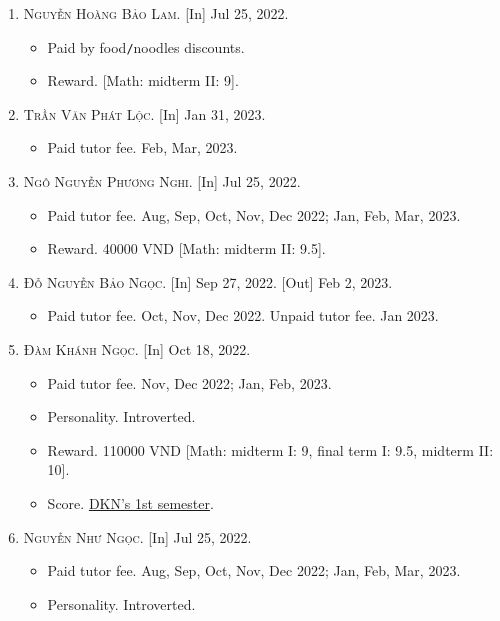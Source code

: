 \documentclass{article}
\begin{document}
\begin{enumerate}
\begin{itemize}
	\end{itemize}
	\item \textsc{Nguyễn Hoàng Bảo Lam.} \textsf{[In]} Jul 25, 2022.
	\begin{itemize}
		\item \textsf{Paid by food\texttt{/}noodles discounts.}
		\item \textsf{Reward.} [Math: midterm II: 9].
	\end{itemize}
	\item \textsc{Trần Văn Phát Lộc.} \textsf{[In]} Jan 31, 2023.
	\begin{itemize}
		\item \textsf{Paid tutor fee.} Feb, Mar, 2023.
	\end{itemize}
	\item \textsc{Ngô Nguyễn Phương Nghi.} \textsf{[In]} Jul 25, 2022.
	\begin{itemize}
		\item \textsf{Paid tutor fee.} Aug, Sep, Oct, Nov, Dec 2022; Jan, Feb, Mar, 2023.
		\item \textsf{Reward.} 40000 VND [Math: midterm II: 9.5].
	\end{itemize}
	\item \textsc{Đỗ Nguyễn Bảo Ngọc.} \textsf{[In]} Sep 27, 2022. \textsf{[Out]} Feb 2, 2023.
	\begin{itemize}
		\item \textsf{Paid tutor fee.} Oct, Nov, Dec 2022. \textsf{Unpaid tutor fee.} Jan 2023.
	\end{itemize}
	\item \textsc{Đàm Khánh Ngọc.} \textsf{[In]} Oct 18, 2022.
	\begin{itemize}
		\item \textsf{Paid tutor fee.} Nov, Dec 2022; Jan, Feb, 2023.
		\item \textsf{Personality.} Introverted.
		\item \textsf{Reward.} 110000 VND [Math: midterm I: 9, final term I: 9.5, midterm II: 10].
		\item \textsf{Score.} \href{https://github.com/NQBH/hobby/blob/master/STEM/student/Dam_Khanh_Ngoc_grade_6_1st_semester.jpg}{DKN's 1st semester}.
	\end{itemize}
	\item \textsc{Nguyễn Như Ngọc.} \textsf{[In]} Jul 25, 2022.
	\begin{itemize}
		\item \textsf{Paid tutor fee.} Aug, Sep, Oct, Nov, Dec 2022; Jan, Feb, Mar, 2023.
		\item \textsf{Personality.} Introverted.

\end{itemize}
\end{enumerate}
\end{document}
